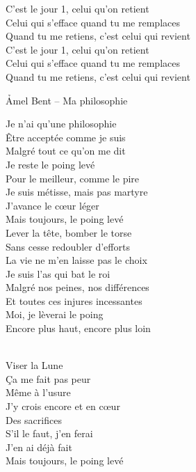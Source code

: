 \documentclass{novel}
\begin{document}
\begin{multicols}{2}
C'est le jour 1, celui qu'on retient \\
Celui qui s'efface quand tu me remplaces \\
Quand tu me retiens, c'est celui qui revient \\
C'est le jour 1, celui qu'on retient \\
Celui qui s'efface quand tu me remplaces \\
Quand tu me retiens, c'est celui qui revient
\end{multicols}

\newpage
\normalsize
\h*{Amel Bent – Ma philosophie}
\begin{multicols}{2}
Je n'ai qu'une philosophie \\
Être acceptée comme je suis \\
Malgré tout ce qu'on me dit \\
Je reste le poing levé \\
Pour le meilleur, comme le pire \\
Je suis métisse, mais pas martyre \\
J'avance le cœur léger \\
Mais toujours, le poing levé \\

Lever la tête, bomber le torse \\
Sans cesse redoubler d'efforts \\
La vie ne m'en laisse pas le choix \\
Je suis l'as qui bat le roi \\
Malgré nos peines, nos différences \\
Et toutes ces injures incessantes \\
Moi, je lèverai le poing \\
Encore plus haut, encore plus loin \\


\begin{bfseries}
[Refrain:]\\
Viser la Lune \\
Ça me fait pas peur \\
Même à l'usure \\
J'y crois encore et en cœur \\
Des sacrifices \\
S'il le faut, j'en ferai \\
J'en ai déjà fait \\
Mais toujours, le poing levé \\
\end{bfseries}


\end{multicols}
\end{document}

